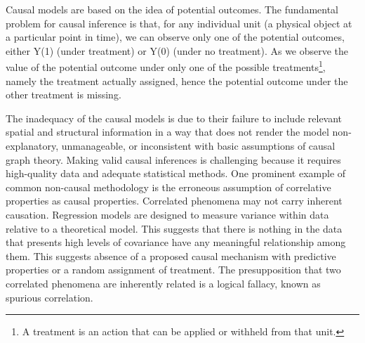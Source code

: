 
Causal models are based on the idea of potential outcomes. 
The fundamental problem for causal inference is that, for any individual unit (a physical object at a particular point in time), we can observe only one of the potential outcomes, either Y(1) (under treatment) or Y(0) (under no treatment). 
As we observe the value of the potential outcome under only one of the possible treatments\footnote{A treatment is an action that can be applied or withheld from that unit.}, namely the treatment actually assigned, hence the potential outcome under the other treatment is missing.

The inadequacy of the causal models is due to their failure to include relevant spatial and structural information in a way that does not render the model non-explanatory, unmanageable, or inconsistent with basic assumptions of causal graph theory. 
Making valid causal inferences is challenging because it requires high-quality data and adequate statistical methods. 
One prominent example of common non-causal methodology is the erroneous assumption of correlative properties as causal properties. 
Correlated phenomena may not carry inherent causation. 
Regression models are designed to measure variance within data relative to a theoretical model. 
This suggests that there is nothing in the data that presents high levels of covariance have any meaningful relationship among them. 
This suggests absence of a proposed causal mechanism with predictive properties or a random assignment of treatment. 
The presupposition that two correlated phenomena are inherently related is a logical fallacy, known as spurious correlation.

